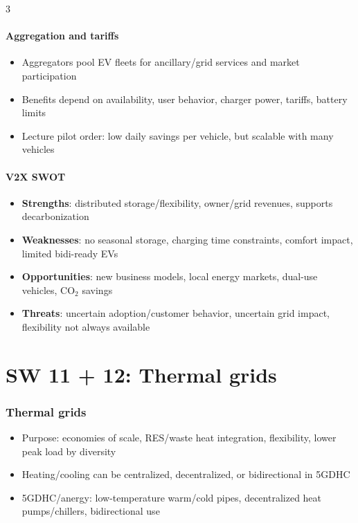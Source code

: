 \documentclass[9pt, landscape, a4paper]{article}
\begin{document}
\begin{multicols*}{3}
\subsection{Aggregation and tariffs}
\begin{itemize}
  \item Aggregators pool EV fleets for ancillary/grid services and market participation
  \item Benefits depend on availability, user behavior, charger power, tariffs, battery limits
  \item Lecture pilot order: low daily savings per vehicle, but scalable with many vehicles
\end{itemize}

\subsection{V2X SWOT}
\begin{itemize}
  \item \textbf{Strengths}: distributed storage/flexibility, owner/grid revenues, supports decarbonization
  \item \textbf{Weaknesses}: no seasonal storage, charging time constraints, comfort impact, limited bidi-ready EVs
  \item \textbf{Opportunities}: new business models, local energy markets, dual-use vehicles, CO$_2$ savings
  \item \textbf{Threats}: uncertain adoption/customer behavior, uncertain grid impact, flexibility not always available
\end{itemize}

\part{SW 11 + 12: Thermal grids}
\section{Thermal grids}
\begin{itemize}
  \item Purpose: economies of scale, RES/waste heat integration, flexibility, lower peak load by diversity
  \item Heating/cooling can be centralized, decentralized, or bidirectional in 5GDHC
  \item 5GDHC/anergy: low-temperature warm/cold pipes, decentralized heat pumps/chillers, bidirectional use
\end{itemize}


\end{multicols*}
\end{document}
